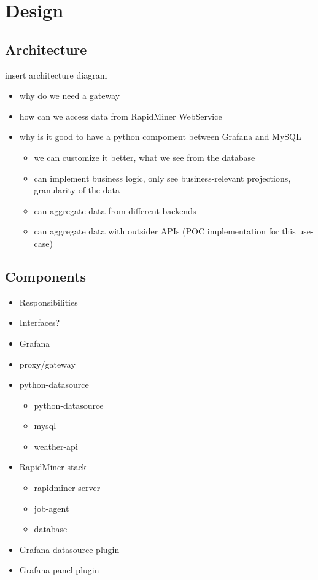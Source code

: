 \chapter{Design}

\section{Architecture}

insert architecture diagram

\begin{itemize}
	\item why do we need a gateway
	\item how can we access data from RapidMiner WebService
	\item why is it good to have a python compoment between Grafana and MySQL
	\begin{itemize}
		\item we can customize it better, what we see from the database
		\item can implement business logic, only see business-relevant projections, granularity of the data
		\item can aggregate data from different backends
		\item can aggregate data with outsider APIs (POC implementation for this use-case)
	\end{itemize}
\end{itemize}

\section{Components}

\begin{itemize}
	\item Responsibilities
	\item Interfaces?
\end{itemize}

\begin{itemize}
	\item Grafana
	\item proxy/gateway
	\item python-datasource
	\begin{itemize}
		\item python-datasource
		\item mysql
		\item weather-api
	\end{itemize}
	\item RapidMiner stack
	\begin{itemize}
		\item rapidminer-server
		\item job-agent
		\item database
	\end{itemize}
	\item Grafana datasource plugin
	\item Grafana panel plugin
\end{itemize}